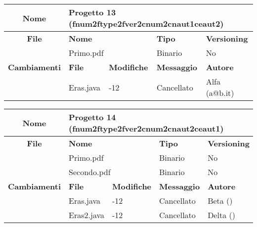 \begin{table}[ht]
\footnotesize
\begin{tabular}{|c|p{2.5cm}|p{2cm}|p{2.5cm}|p{2.5cm}|}
  \hline
  \textbf{Nome}	& \multicolumn{4}{l|}{Progetto 13 (fnum2ftype2fver2cnum2cnaut1ceaut2)} 									\\
  \hline
  \rowcolor{lightgray}\textbf{File} 		& \multicolumn{2}{l|}{\textbf{Nome}}		& \textbf{Tipo}		& \textbf{Versioning} 		\\
						\cline{2-5}
						& \multicolumn{2}{l|}{Primo.pdf}		& Binario		& No				\\
  \hline
  \rowcolor{lightgray}\textbf{Cambiamenti}	& \textbf{File}		&\textbf{Modifiche}	& \textbf{Messaggio}	& \textbf{Autore}		\\
						\cline{2-5}
						& Eras.java		& -12	  		& Cancellato		& Alfa (a@b.it)			\\
						
  \hline
\end{tabular}
\end{table}

\begin{table}[ht]
\footnotesize
\begin{tabular}{|c|p{2.5cm}|p{2cm}|p{2.5cm}|p{2.5cm}|}
  \hline
  \textbf{Nome}	& \multicolumn{4}{l|}{Progetto 14 (fnum2ftype2fver2cnum2cnaut2ceaut1)} 									\\
  \hline
  \rowcolor{lightgray}\textbf{File} 		& \multicolumn{2}{l|}{\textbf{Nome}}		& \textbf{Tipo}		& \textbf{Versioning} 		\\
						\cline{2-5}
						& \multicolumn{2}{l|}{Primo.pdf}		& Binario		& No				\\
						\cline{2-5}
						& \multicolumn{2}{l|}{Secondo.pdf}		& Binario		& No				\\
  \hline
  \rowcolor{lightgray}\textbf{Cambiamenti}	& \textbf{File}		&\textbf{Modifiche}	& \textbf{Messaggio}	& \textbf{Autore}		\\
						\cline{2-5}
						& Eras.java		& -12	  		& Cancellato		& Beta ()			\\
						\cline{2-5}
						& Eras2.java		& -12	  		& Cancellato		& Delta ()			\\
  \hline
\end{tabular}
\end{table}

